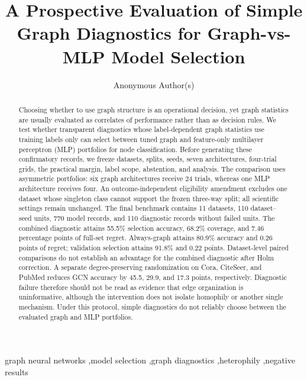 \documentclass[preprint,12pt]{elsarticle}
\begin{document}
\begin{frontmatter}

\title{A Prospective Evaluation of Simple Graph Diagnostics for Graph-vs-MLP Model Selection}

\author{Anonymous Author(s)}

\begin{abstract}
Choosing whether to use graph structure is an operational decision, yet graph statistics are usually evaluated as correlates of performance rather than as decision rules. We test whether transparent diagnostics whose label-dependent graph statistics use training labels only can select between tuned graph and feature-only multilayer perceptron (MLP) portfolios for node classification. Before generating these confirmatory records, we freeze datasets, splits, seeds, seven architectures, four-trial grids, the practical margin, label scope, abstention, and analysis. The comparison uses asymmetric portfolios: six graph architectures receive 24 trials, whereas one MLP architecture receives four. An outcome-independent eligibility amendment excludes one dataset whose singleton class cannot support the frozen three-way split; all scientific settings remain unchanged. The final benchmark contains 11 datasets, 110 dataset--seed units, 770 model records, and 110 diagnostic records without failed units. The combined diagnostic attains 55.5\% selection accuracy, 68.2\% coverage, and 7.46 percentage points of full-set regret. Always-graph attains 80.9\% accuracy and 0.26 points of regret; validation selection attains 91.8\% and 0.22 points. Dataset-level paired comparisons do not establish an advantage for the combined diagnostic after Holm correction. A separate degree-preserving randomization on Cora, CiteSeer, and PubMed reduces GCN accuracy by 45.5, 29.9, and 17.3 points, respectively. Diagnostic failure therefore should not be read as evidence that edge organization is uninformative, although the intervention does not isolate homophily or another single mechanism. Under this protocol, simple diagnostics do not reliably choose between the evaluated graph and MLP portfolios.
\end{abstract}

\begin{keyword}
graph neural networks \sep model selection \sep graph diagnostics \sep heterophily \sep negative results
\end{keyword}

\end{frontmatter}
\end{document}
